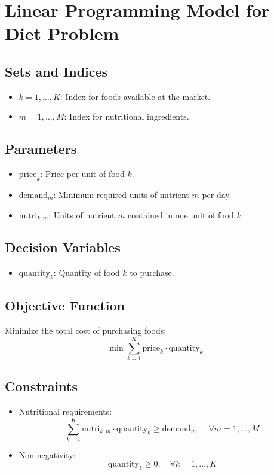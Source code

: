 \documentclass{article}
\begin{document}
\section*{Linear Programming Model for Diet Problem}

\subsection*{Sets and Indices}
\begin{itemize}
    \item $k = 1, \ldots, K$: Index for foods available at the market.
    \item $m = 1, \ldots, M$: Index for nutritional ingredients.
\end{itemize}

\subsection*{Parameters}
\begin{itemize}
    \item $\text{price}_{k}$: Price per unit of food $k$.
    \item $\text{demand}_{m}$: Minimum required units of nutrient $m$ per day.
    \item $\text{nutri}_{k,m}$: Units of nutrient $m$ contained in one unit of food $k$.
\end{itemize}

\subsection*{Decision Variables}
\begin{itemize}
    \item $\text{quantity}_{k}$: Quantity of food $k$ to purchase.
\end{itemize}

\subsection*{Objective Function}
Minimize the total cost of purchasing foods:
\[
\min \sum_{k=1}^{K} \text{price}_{k} \cdot \text{quantity}_{k}
\]

\subsection*{Constraints}
\begin{itemize}
    \item Nutritional requirements:
    \[
    \sum_{k=1}^{K} \text{nutri}_{k,m} \cdot \text{quantity}_{k} \geq \text{demand}_{m}, \quad \forall m = 1, \ldots, M
    \]
    \item Non-negativity:
    \[
    \text{quantity}_{k} \geq 0, \quad \forall k = 1, \ldots, K
    \]
\end{itemize}
\end{document}
